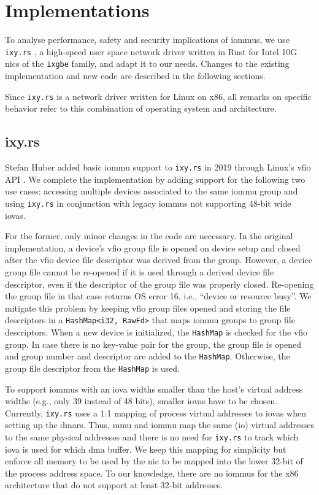 \chapter{Implementations}
\label{chap:implementations}

To analyse performance, safety and security implications of \acp{iommu}, we use
\texttt{ixy.rs} \cite{ellmann2018writing}, a high-speed user space network
driver written in Rust for Intel 10G \acp{nic} of the \texttt{ixgbe} family, and
adapt it to our needs. Changes to the existing implementation and new code are
described in the following sections.

Since \texttt{ixy.rs} is a network driver written for Linux on x86, all remarks
on specific behavior refer to this combination of operating system and
architecture.


\section{ixy.rs}
\label{sec:ixy_rs}

Stefan Huber added basic \ac{iommu} support to \texttt{ixy.rs} in 2019 through
Linux's \ac{vfio} API \cite{huber2019using}. We complete the implementation by
adding support for the following two use cases: accessing multiple devices
associated to the same \ac{iommu} group and using \texttt{ixy.rs} in conjunction
with legacy \acp{iommu} not supporting 48-bit wide \acp{iova}.

For the former, only minor changes in the code are necessary. In the original
implementation, a device's \ac{vfio} group file is opened on device setup and
closed after the \ac{vfio} device file descriptor was derived from the group.
However, a device group file cannot be re-opened if it is used through a derived
device file descriptor, even if the descriptor of the group file was properly
closed.  Re-opening the group file in that case returns OS error 16, i.e.,
``device or resource busy''. We mitigate this problem by keeping \ac{vfio} group
files opened and storing the file descriptors in a \texttt{HashMap<i32, RawFd>}
that maps \ac{iommu} groups to group file descriptors. When a new device is
initialized, the \texttt{HashMap} is checked for the \ac{vfio} group. In case
there is no key-value pair for the group, the group file is opened and group
number and descriptor are added to the \texttt{HashMap}. Otherwise, the group
file descriptor from the \texttt{HashMap} is used.

To support \acp{iommu} with an \ac{iova} widths smaller than the host's virtual
address widths (e.g., only 39 instead of 48 bits), smaller \acp{iova} have to be
chosen. Currently, \texttt{ixy.rs} uses a 1:1 mapping of process virtual
addresses to \acp{iova} when setting up the \acp{dmar}. Thus, \ac{mmu} and
\ac{iommu} map the same (\ac{io}) virtual addresses to the same physical
addresses and there is no need for \texttt{ixy.rs} to track which \ac{iova} is
used for which \ac{dma} buffer. We keep this mapping for simplicity but enforce
all memory to be used by the \ac{nic} to be mapped into the lower 32-bit of the
process address space. To our knowledge, there are no \acp{iommu} for the x86
architecture that do not support at least 32-bit addresses.

